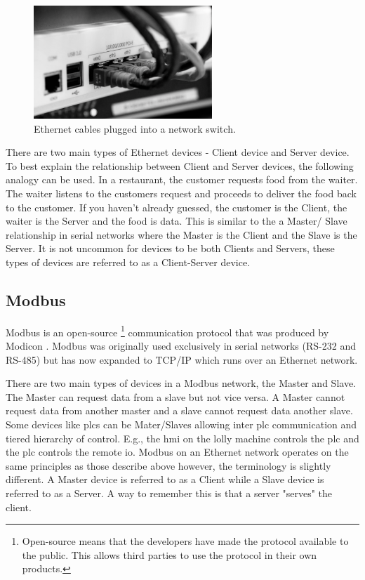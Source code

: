     \begin{figure}[H]
        \centering
        \includegraphics[width = 0.6\textwidth]{2_images/ethernetCables.png}
        \caption{Ethernet cables plugged into a network switch\cite{scott2021networking}.}
        \label{fig:ethenetCables}
    \end{figure} 

    There are two main types of Ethernet devices - Client device and Server device. To best explain the relationship between Client and Server devices, the following analogy can be used. In a restaurant, the customer requests food from the waiter. The waiter listens to the customers request and proceeds to deliver the food back to the customer. If you haven't already guessed, the customer is the Client, the waiter is the Server and the food is data. This is similar to the a Master/ Slave relationship in serial networks where the Master is the Client and the Slave is the Server. It is not uncommon for devices to be both Clients and Servers, these types of devices are referred to as a Client-Server device.

\subsection{Modbus}
    Modbus is an open-source \footnote{Open-source means that the developers have made the protocol available to the public. This allows third parties to use the protocol in their own products.} communication protocol that was produced by Modicon \cite{frenzel2015handbook}. Modbus was originally used exclusively in serial networks (RS-232 and RS-485) but has now expanded to TCP/IP which runs over an Ethernet network\cite{frenzel2015handbook}. 
    
    There are two main types of devices in a Modbus network, the Master and Slave\cite{frenzel2015handbook}. The Master can request data from a slave but not vice versa. A Master cannot request data from another master and a slave cannot request data another slave. Some devices like \acrshort{plc}s can be Mater/Slaves allowing inter \acrshort{plc} communication and tiered hierarchy of control. E.g., the \acrshort{hmi} on the lolly machine controls the \acrshort{plc} and the \acrshort{plc} controls the remote \acrshort{io}. Modbus on an Ethernet network operates on the same principles as those describe above however, the terminology is slightly different. A Master device is referred to as a Client while a Slave device is referred to as a Server. A way to remember this is that a server "serves" the client.
    
